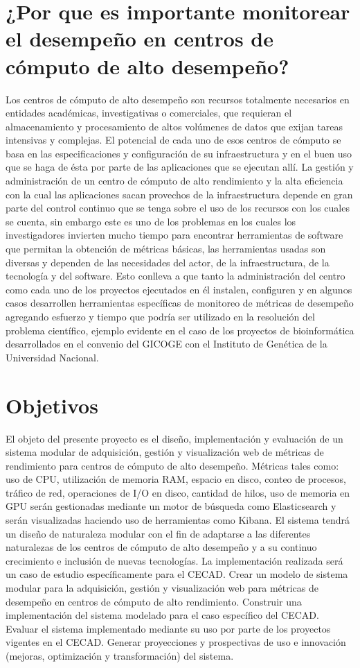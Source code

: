 \newpage

\section{¿Por que es importante monitorear el desempeño en centros de cómputo de alto desempeño?}

Los centros de cómputo de alto desempeño son recursos totalmente necesarios en entidades académicas, investigativas o comerciales, que requieran el almacenamiento y procesamiento de altos volúmenes de datos que exijan tareas intensivas y complejas.  El potencial de cada uno de esos centros de cómputo se basa en las especificaciones y configuración de su infraestructura y en el buen uso que se haga de ésta por parte de las aplicaciones que se ejecutan allí. La gestión y administración de un centro de cómputo de alto rendimiento y la alta eficiencia con la cual las aplicaciones sacan provechos de la infraestructura depende en gran parte del control continuo que se tenga sobre el uso de los recursos con los cuales se cuenta, sin embargo este es uno de los problemas en los cuales los investigadores invierten mucho tiempo para encontrar herramientas de software que permitan la obtención de métricas básicas, las herramientas usadas son diversas y dependen de las necesidades del actor, de la infraestructura, de la tecnología y del software. Esto conlleva a que tanto la administración del centro como cada uno de los proyectos ejecutados en él instalen, configuren y en algunos casos desarrollen herramientas específicas de monitoreo de métricas de desempeño agregando esfuerzo y tiempo que podría ser utilizado en la resolución del problema científico, ejemplo evidente en el caso de los proyectos de bioinformática desarrollados en el convenio del GICOGE con el Instituto de Genética de la Universidad Nacional.


\section{Objetivos}
El objeto del presente proyecto es el diseño, implementación y evaluación de un sistema modular de adquisición, gestión y visualización web de métricas de rendimiento para centros de cómputo de alto desempeño. Métricas tales como: uso de CPU, utilización de memoria RAM, espacio en disco, conteo de procesos, tráfico de red, operaciones de I/O en disco, cantidad de hilos, uso de memoria en GPU serán gestionadas mediante un motor de búsqueda como Elasticsearch y serán visualizadas haciendo uso de herramientas como Kibana. El sistema  tendrá un diseño de naturaleza modular con el fin de adaptarse a las diferentes naturalezas de los centros de cómputo de alto desempeño y a su continuo crecimiento e inclusión de nuevas tecnologías. La implementación realizada será un caso de estudio específicamente para el CECAD.
Crear un modelo de sistema modular para la adquisición, gestión y visualización web para métricas de desempeño en centros de cómputo de alto rendimiento.
Construir una implementación del sistema modelado para el caso específico del CECAD.
Evaluar el sistema implementado mediante su uso por parte de los proyectos vigentes en el CECAD.
Generar proyecciones y prospectivas de uso e innovación (mejoras, optimización y transformación) del sistema.

